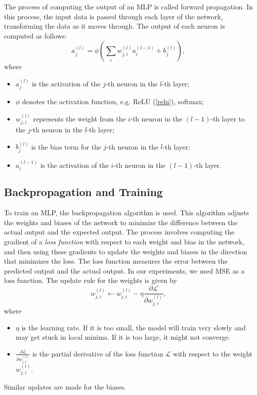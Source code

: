 The process of computing the output of an MLP is called forward propagation.
In this process, the input data is passed through each layer of the network, transforming the data as it moves through. The output of each neuron is computed as follows:
\begin{equation}
	a^{(l)}_j = \phi\left(\sum_{i} w^{(l)}_{j,i} a^{(l-1)}_i + b^{(l)}_j\right),
\end{equation}
where
\begin{itemize}
	\item $a^{(l)}_j$ is the activation of the $j$-th neuron in the $l$-th layer;
	\item $\phi$ denotes the activation function, e.g. ReLU (\autoref{relu}), softmax;
	\item $w^{(l)}_{j,i}$ represents the weight from the $i$-th neuron in the $(l-1)$-th layer to the $j$-th neuron in the $l$-th layer;
	\item $b^{(l)}_j$ is the bias term for the $j$-th neuron in the $l$-th layer;
	\item $a^{(l-1)}_i$ is the activation of the $i$-th neuron in the $(l-1)$-th layer.
\end{itemize}

\subsection{Backpropagation and Training}

To train an MLP, the backpropagation algorithm is used.
This algorithm adjusts the weights and biases of the network to minimize the difference between the actual output and the expected output.
The process involves computing the gradient of a \emph{loss function} with respect to each weight and bias in the network, and then using these gradients to update the weights and biases in the direction that minimizes the loss.
The loss function measures the error between the predicted output and the actual output. In our experiments, we used MSE as a loss function. The update rule for the weights is given by
\begin{equation}
	w^{(l)}_{j,i} \leftarrow w^{(l)}_{j,i} - \eta \frac{\partial \mathcal{L}}{\partial w^{(l)}_{j,i}},
\end{equation}
where
\begin{itemize}
	\item $\eta$ is the learning rate. If it is too small, the model will train very slowly and may get stuck in local minima. If it is too large, it might not converge.
	\item $\frac{\partial \mathcal{L}}{\partial w^{(l)}_{j,i}}$ is the partial derivative of the loss function $\mathcal{L}$ with respect to the weight $w^{(l)}_{j,i}$.
\end{itemize}
Similar updates are made for the biases.

